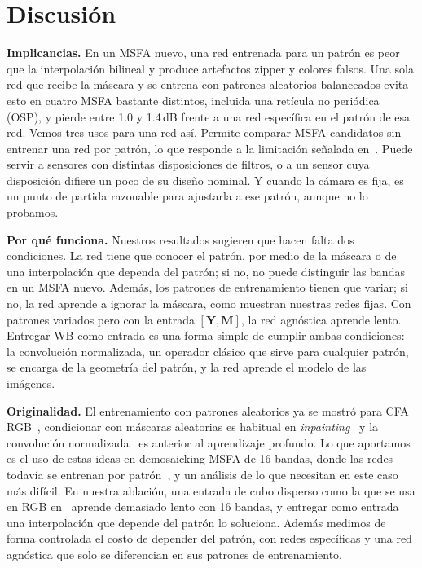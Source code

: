 \documentclass{article}
\def\Y{{\mathbf Y}}
\def\M{{\mathbf M}}
\begin{document}
\section{Discusión}
\label{sec:discussion}

\textbf{Implicancias.} En un MSFA nuevo, una red entrenada para un patrón es
peor que la interpolación bilineal y produce artefactos zipper y colores
falsos. Una sola red que recibe la máscara y se entrena con patrones
aleatorios balanceados evita esto en cuatro MSFA bastante distintos,
incluida una retícula no periódica (OSP), y pierde entre 1.0 y 1.4\,dB
frente a una red específica en el patrón de esa red. Vemos tres usos para
una red así. Permite comparar MSFA candidatos sin entrenar una red por
patrón, lo que responde a la limitación señalada en~\cite{diaz2023}. Puede
servir a sensores con distintas disposiciones de filtros, o a un sensor cuya
disposición difiere un poco de su diseño nominal. Y cuando la cámara es
fija, es un punto de partida razonable para ajustarla a ese patrón, aunque
no lo probamos.

\textbf{Por qué funciona.} Nuestros resultados sugieren que hacen falta dos
condiciones. La red tiene que conocer el patrón, por medio de la máscara o
de una interpolación que dependa del patrón; si no, no puede distinguir las
bandas en un MSFA nuevo. Además, los patrones de entrenamiento tienen que
variar; si no, la red aprende a ignorar la máscara, como muestran nuestras
redes fijas. Con patrones variados pero con la entrada $[\Y,\M]$, la red
agnóstica aprende lento. Entregar WB como entrada es una forma simple de
cumplir ambas condiciones: la convolución normalizada, un operador clásico
que sirve para cualquier patrón, se encarga de la geometría del patrón, y la
red aprende el modelo de las imágenes.

\textbf{Originalidad.} El entrenamiento con patrones aleatorios ya se mostró
para CFA RGB~\cite{bourrier2022}, condicionar con máscaras aleatorias es
habitual en \emph{inpainting}~\cite{liu2018} y la convolución
normalizada~\cite{knutsson1993} es anterior al aprendizaje profundo. Lo que
aportamos es el uso de estas ideas en demosaicking MSFA de 16 bandas, donde
las redes todavía se entrenan por patrón~\cite{feng2021,diaz2023}, y un
análisis de lo que necesitan en este caso más difícil. En nuestra ablación,
una entrada de cubo disperso como la que se usa en RGB
en~\cite{bourrier2022} aprende demasiado lento con 16 bandas, y entregar como
entrada una interpolación que depende del patrón lo soluciona. Además
medimos de forma controlada el costo de depender del patrón, con redes
específicas y una red agnóstica que solo se diferencian en sus patrones de
entrenamiento.
\end{document}
